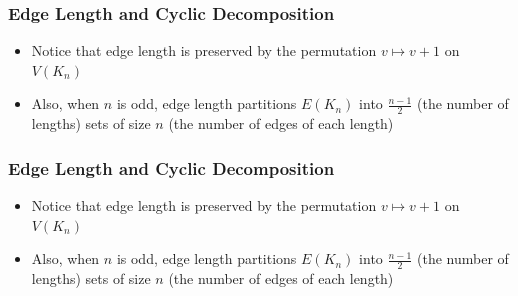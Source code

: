 \documentclass[11pt,serif,professionalfont,aspectratio=169]{beamer}
\newcommand{\vertex}{\node[vertex]}
\theoremstyle{plain}
\begin{document}
\begin{frame}
\frametitle{Edge Length and Cyclic Decomposition}
\begin{itemize}
    \item Notice that edge length is preserved by the permutation $v\mapsto v+1$ on $V(K_n)$
    \pause
    \item Also, when $n$ is odd, edge length partitions $E(K_n)$ into $\frac{n-1}{2}$ (the number of lengths) sets of size $n$ (the number of edges of each length) 
    \pause
\end{itemize}
\begin{center}
\end{center}
    
\end{frame}
\begin{frame}
\frametitle{Edge Length and Cyclic Decomposition}
\begin{itemize}
    \item Notice that edge length is preserved by the permutation $v\mapsto v+1$ on $V(K_n)$
    \item Also, when $n$ is odd, edge length partitions $E(K_n)$ into $\frac{n-1}{2}$ (the number of lengths) sets of size $n$ (the number of edges of each length) 
\end{itemize}
\begin{center}
\end{center}
    
\end{frame}
\end{document}

